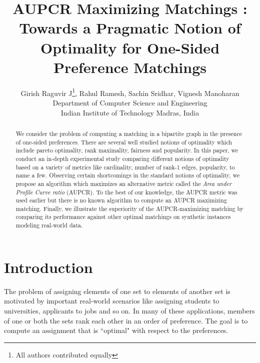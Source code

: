 \documentclass[letterpaper]{article} %
\begin{document}
\title{AUPCR Maximizing Matchings : Towards a Pragmatic Notion of Optimality for One-Sided Preference Matchings} %
\author{ Girish Raguvir J\thanks{All authors contributed equally},  Rahul Ramesh\footnotemark[1],  Sachin Sridhar\footnotemark[1], Vignesh Manoharan\footnotemark[1]\\
Department of Computer Science and Engineering\\
Indian Institute of Technology Madras, India
}
\maketitle
\begin{abstract}
We consider the problem of computing a matching in a bipartite graph in the presence of one-sided preferences.
There are several well studied notions of optimality which include pareto optimality, rank maximality, fairness and popularity. In this paper, we conduct an in-depth experimental study comparing different notions of optimality based on a variety of metrics like cardinality, number of rank-1 edges, popularity, to name a few. Observing certain shortcomings in the standard notions of optimality, we propose an algorithm which maximizes an alternative metric called the \textit{Area under Profile Curve ratio} (AUPCR). To the best of our knowledge, the AUPCR metric was used earlier but there is no known algorithm to compute an AUPCR maximizing matching. Finally, we illustrate the superiority of the AUPCR-maximizing matching by comparing its performance against other optimal matchings on synthetic instances modeling real-world data.
\end{abstract}
\section{Introduction}
The problem of assigning elements of one set to elements of another set is motivated by important real-world scenarios like assigning students to universities, applicants to jobs and so on. In many of these applications, members of one or both the sets rank each other in an order of preference. The goal is to compute an assignment that is ``optimal" with respect to the preferences.
\end{document}
